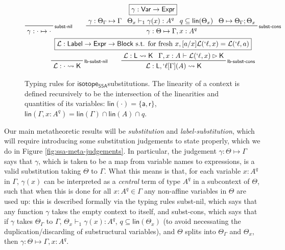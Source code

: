 \documentclass[acmsmall,screen,review]{acmart}
\newcommand{\mc}[1]{\ensuremath{\mathcal{#1}}}
\newcommand{\ms}[1]{\ensuremath{\mathsf{#1}}}
\newcommand{\lbl}[1]{{`#1}}
\newcommand{\brb}[2]{\ms{br}\;#1\;#2}
\newcommand{\lbrb}[2]{\brb{\lbl{#1}}{#2}}
\newcommand{\csplits}[3]{#1 \mapsto #2;#3}
\newcommand{\tlin}[2]{#2 \subseteq \ms{lin}(#1)}
\newcommand{\thyp}[3]{#1: {#2}^{#3}}
\newcommand{\lhyp}[3]{#1[#2](#3)}
\newcommand{\llhyp}[3]{\lhyp{\lbl{#1}}{#2}{#3}}
\newcommand{\rle}[1]{{\scriptsize\textsf{#1}}}
\newcommand{\tint}{{\{\ms{a}, \ms{r}\}}}
\newcommand{\hasty}[5]{#1 \vdash_{#2} #3: {#4}^{#5}}
\newcommand{\haslb}[3]{#1 \vdash #2 \rhd #3}
\newcommand{\issubst}[3]{#1: #2 \mapsto #3}
\newcommand{\lbsubst}[3]{#1: #2 \rightsquigarrow #3}
\newcommand{\isotopessa}{\ms{isotope_{SSA}}}
\begin{document}
\begin{figure}
  \begin{gather*}
    \boxed{\gamma: \ms{Var} \to \ms{Expr}}
    \\
    \prftree[r]{\rle{subst-nil}}
      {\issubst{\gamma}{\cdot}{\cdot}}
      \qquad
    \prftree[r]{\rle{subst-cons}}
      {\issubst{\gamma}{\Theta_\Gamma}{\Gamma}}
      {\hasty{\Theta_x}{1}{\gamma(x)}{A}{q}}
      {\tlin{\Theta_x}{q}}
      {\csplits{\Theta}{\Theta_\Gamma}{\Theta_x}}
      {\issubst{\gamma}{\Theta}{\Gamma, \thyp{x}{A}{q}}}
    \\
    \boxed{\mc{L}: \ms{Label} \to \ms{Expr} \to \ms{Block} \text{ s.t. for fresh } x, [a/x]\mc{L}(\lbl{\ell}, x) = \mc{L}(\lbl{\ell}, a)}
    \\
    \prftree[r]{\rle{lb-subst-nil}}
    {\lbsubst{\mc{L}}{\cdot}{\ms{K}}}
      \qquad
    \prftree[r]{\rle{lb-subst-cons}}
      {\lbsubst{\mc{L}}{\ms{L}}{\ms{K}}}
      {\haslb{\Gamma, \thyp{x}{A}{}}{\mc{L}(\lbl{\ell}, x)}{\ms{K}}}
      {\lbsubst{\mc{L}}{\ms{L}, \llhyp{\ell}{\Gamma}{A}}{\ms{K}}}
  \end{gather*}
  \caption{ Typing rules for \isotopessa substitutions. The linearity of a
    context is defined recursively to be the intersection of the linearities and
    quantities of its variables: \(\ms{lin}(\cdot) = \tint\),
    \(\ms{lin}(\Gamma, \thyp{x}{A}{q}) = \ms{lin}(\Gamma) \cap \ms{lin}(A) \cap
    q\). 
  } 
  \label{fig:ssa-subst-typing}
\end{figure}

Our main metatheoretic results will be \textit{substitution} and
\textit{label-substitution}, which will require introducing some substitution
judgements to state properly, which we do in Figure
\ref{fig:ssa-meta-judgements}. In particular, the judgement
\(\issubst{\gamma}{\Theta}{\Gamma}\) says that \(\gamma\), which is taken to be
a map from variable names to expressions, is a valid substitution taking
\(\Theta\) to \(\Gamma\). What this means is that, for each variable
\(\thyp{x}{A}{q}\) in \(\Gamma\), \(\gamma(x)\) can be interpreted as a
\textit{central} term of type \(A^q\) in a subcontext of \(\Theta\), such that
when this is done for all \(\thyp{x}{A}{q} \in \Gamma\) any non-affine variables
in \(\Theta\) are used up: this is described formally via the typing rules
\rle{subst-nil}, which says that any function \(\gamma\) takes the empty context
to itself, and \rle{subst-cons}, which says that if \(\gamma\) takes
\(\Theta_\Gamma\) to \(\Gamma\), \(\hasty{\Theta_x}{1}{\gamma(x)}{A}{q}\), \(q
\subseteq \ms{lin}(\Theta_x)\) (to avoid necessating the duplication/discarding
of substructural variables), and \(\Theta\) splits into \(\Theta_\Gamma\) and
\(\Theta_x\), then \(\issubst{\gamma}{\Theta}{\Gamma, \thyp{x}{A}{q}}\).
\end{document}
